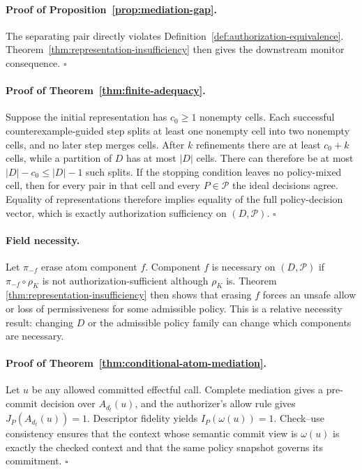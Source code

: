 \paragraph{Proof of Proposition~\ref{prop:mediation-gap}.}
The separating pair directly violates Definition~\ref{def:authorization-equivalence}.
Theorem~\ref{thm:representation-insufficiency} then gives the downstream
monitor consequence. \hfill$\square$

\paragraph{Proof of Theorem~\ref{thm:finite-adequacy}.}
Suppose the initial representation has $c_0\geq 1$ nonempty cells.  Each
successful counterexample-guided step splits at least one nonempty cell into two
nonempty cells, and no later step merges cells.  After $k$ refinements there are
at least $c_0+k$ cells, while a partition of $D$ has at most $|D|$ cells.  There
can therefore be at most $|D|-c_0\leq |D|-1$ such splits.  If the stopping
condition leaves no policy-mixed cell, then for every pair in that cell and
every $P\in\mathcal P$ the ideal decisions agree.  Equality of representations
therefore implies equality of the full policy-decision vector, which is exactly
authorization sufficiency on $(D,\mathcal P)$. \hfill$\square$

\paragraph{Field necessity.}
Let $\pi_{-f}$ erase atom component $f$. Component $f$ is necessary on
$(D,\mathcal{P})$ if $\pi_{-f}\circ\rho_K$ is not
authorization-sufficient although $\rho_K$ is. Theorem
\ref{thm:representation-insufficiency} then shows that erasing $f$ forces an
unsafe allow or loss of permissiveness for some admissible policy. This is a
relative necessity result: changing $D$ or the admissible policy family can
change which components are necessary.

\paragraph{Proof of Theorem~\ref{thm:conditional-atom-mediation}.}
Let $u$ be any allowed committed effectful call.  Complete mediation gives a
pre-commit decision over $A_{d_t}(u)$, and the authorizer's allow rule gives
$J_P(A_{d_t}(u))=1$.  Descriptor fidelity yields $I_P(\omega(u))=1$.
Check--use consistency ensures that the context whose semantic commit view is
$\omega(u)$ is exactly the checked context and that the same policy snapshot
governs its commitment. \hfill$\square$

